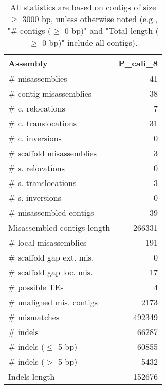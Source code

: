 \documentclass[12pt,a4paper]{article}
\begin{document}
\begin{table}[ht]
\begin{center}
\caption{All statistics are based on contigs of size $\geq$ 3000 bp, unless otherwise noted (e.g., "\# contigs ($\geq$ 0 bp)" and "Total length ($\geq$ 0 bp)" include all contigs).}
\begin{tabular}{|l*{1}{|r}|}
\hline
Assembly & P\_cali\_8 \\ \hline
\# misassemblies & 41 \\ \hline
\hspace{2mm}\# contig misassemblies & 38 \\ \hline
\hspace{5mm}\# c. relocations & 7 \\ \hline
\hspace{5mm}\# c. translocations & 31 \\ \hline
\hspace{5mm}\# c. inversions & 0 \\ \hline
\hspace{2mm}\# scaffold misassemblies & 3 \\ \hline
\hspace{5mm}\# s. relocations & 0 \\ \hline
\hspace{5mm}\# s. translocations & 3 \\ \hline
\hspace{5mm}\# s. inversions & 0 \\ \hline
\# misassembled contigs & 39 \\ \hline
Misassembled contigs length & 266331 \\ \hline
\# local misassemblies & 191 \\ \hline
\# scaffold gap ext. mis. & 0 \\ \hline
\# scaffold gap loc. mis. & 17 \\ \hline
\# possible TEs & 4 \\ \hline
\# unaligned mis. contigs & 2173 \\ \hline
\# mismatches & 492349 \\ \hline
\# indels & 66287 \\ \hline
\hspace{5mm}\# indels ($\leq$ 5 bp) & 60855 \\ \hline
\hspace{5mm}\# indels ($>$ 5 bp) & 5432 \\ \hline
Indels length & 152676 \\ \hline
\end{tabular}
\end{center}
\end{table}
\end{document}
